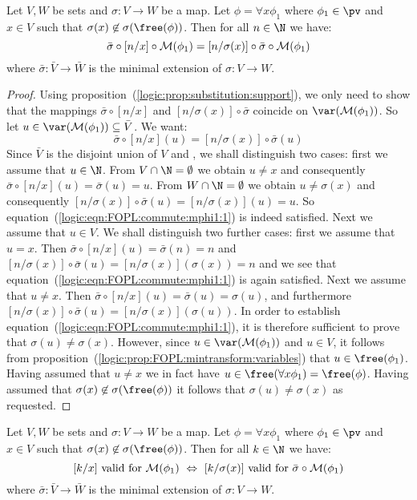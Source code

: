 \begin{lemma}\label{logic:lemma:FOPL:commute:mphi1}
Let $V,W$ be sets and $\sigma:V\to W$ be a map. Let $\phi=\forall
x\phi_{1}$ where $\phi_{1}\in\pv$ and $x\in V$ such that
$\sigma(x)\not\in\sigma(\free(\phi))$. Then for all $n\in\N$ we
have:
    \[
        \bar{\sigma}\circ [n/x]\circ{\cal
    M}(\phi_{1})= [n/\sigma(x)]\circ\bar{\sigma}\circ{\cal M}(\phi_{1})
    \]
where $\bar{\sigma}:\bar{V}\to\bar{W}$ is the minimal extension of
$\sigma: V\to W$.
\end{lemma}
\begin{proof}
Using proposition~(\ref{logic:prop:substitution:support}), we only
need to show that the mappings $\bar{\sigma}\circ [n/x]$ and
$[n/\sigma(x)]\circ\bar{\sigma}$ coincide on $\var({\cal
M}(\phi_{1}))$. So let $u\in\var({\cal
M}(\phi_{1}))\subseteq\bar{V}$. We want:
    \begin{equation}\label{logic:eqn:FOPL:commute:mphi1:1}
    \bar{\sigma}\circ [n/x](u)=[n/\sigma(x)]\circ\bar{\sigma}(u)
    \end{equation}
Since $\bar{V}$ is the disjoint union of $V$ and \N, we shall
distinguish two cases: first we assume that $u\in\N$. From
$V\cap\N=\emptyset$ we obtain $u\neq x$ and consequently
$\bar{\sigma}\circ[n/x](u)=\bar{\sigma}(u)=u$. From
$W\cap\N=\emptyset$ we obtain $u\neq\sigma(x)$ and consequently
$[n/\sigma(x)]\circ\bar{\sigma}(u)=[n/\sigma(x)](u)=u$. So
equation~(\ref{logic:eqn:FOPL:commute:mphi1:1}) is indeed satisfied.
Next we assume that $u\in V$. We shall distinguish two further
cases: first we assume that $u=x$. Then
$\bar{\sigma}\circ[n/x](u)=\bar{\sigma}(n)=n$ and
$[n/\sigma(x)]\circ\bar{\sigma}(u)=[n/\sigma(x)](\sigma(x))=n$ and
we see that equation~(\ref{logic:eqn:FOPL:commute:mphi1:1}) is again
satisfied. Next we assume that $u\neq x$. Then
$\bar{\sigma}\circ[n/x](u)=\bar{\sigma}(u)=\sigma(u)$, and
furthermore
$[n/\sigma(x)]\circ\bar{\sigma}(u)=[n/\sigma(x)](\sigma(u))$. In
order to establish equation~(\ref{logic:eqn:FOPL:commute:mphi1:1}),
it is therefore sufficient to prove that $\sigma(u)\neq\sigma(x)$.
However, since $u\in\var({\cal M}(\phi_{1}))$ and $u\in V$, it
follows from
proposition~(\ref{logic:prop:FOPL:mintransform:variables}) that
$u\in\free(\phi_{1})$. Having assumed that $u\neq x$ we in fact have
$u\in\free(\forall x\phi_{1})=\free(\phi)$. Having assumed that
$\sigma(x)\not\in\sigma(\free(\phi))$ it follows that
$\sigma(u)\neq\sigma(x)$ as requested.
\end{proof}
\begin{lemma}\label{logic:lemma:FOPL:commute:n:equivalence}
Let $V,W$ be sets and $\sigma:V\to W$ be a map. Let $\phi=\forall
x\phi_{1}$ where $\phi_{1}\in\pv$ and $x\in V$ such that
$\sigma(x)\not\in\sigma(\free(\phi))$. Then for all $k\in\N$ we
have:
    \[
    \mbox{$[k/x]$ valid for ${\cal M}(\phi_{1})$}\ \Leftrightarrow
    \ \mbox{$[k/\sigma(x)]$ valid for $\bar{\sigma}\circ{\cal M}(\phi_{1})$}
    \]
where $\bar{\sigma}:\bar{V}\to\bar{W}$ is the minimal extension of
$\sigma: V\to W$.
\end{lemma}
